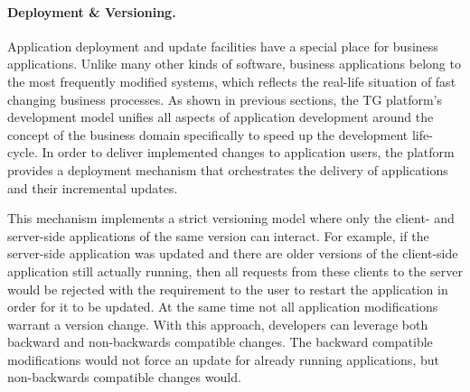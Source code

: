  \paragraph{Deployment \& Versioning.}
  Application deployment and update facilities have a special place for business applications.
  Unlike many other kinds of software, business applications belong to the most frequently modified systems, which reflects the real-life situation of fast changing business processes.
  As shown in previous sections, the TG platform's development model unifies all aspects of application development around the concept of the business domain specifically to speed up the development life-cycle.
  In order to deliver implemented changes to application users, the platform provides a deployment mechanism that orchestrates the delivery of applications and their incremental updates.
  
  This mechanism implements a strict versioning model where only the client- and server-side applications of the same version can interact.
  For example, if the server-side application was updated and there are older versions of the client-side application still actually running, then all requests from these clients to the server would be rejected with the requirement to the user to restart the application in order for it to be updated.
  At the same time not all application modifications warrant a version change.
  With this approach, developers can leverage both backward and non-backwards compatible changes.
  The backward compatible modifications would not force an update for already running applications, but non-backwards compatible changes would.
  